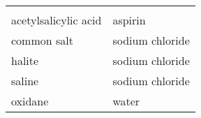 
%
%
{ %


\newcommand{\tableheader}{\rowcolor{myblue}\multicolumn{2}{l}{\colhead{aliases}} \\}
\newcommand{\columnheaders}{\rowcolor{myblue}\colhead{\pk{alias}} & \colhead{\fk{aliased}} \\}

\begin{tabular}[t] {|l|l|} %
\hline
\tableheader
\hline
\columnheaders
\hline 
acetylsalicylic acid & aspirin	\\
\hline
 common salt  & sodium chloride \\
\hline
halite  & sodium chloride \\
\hline
saline & sodium chloride  \\	
\hline
oxidane & water 	 \\
\hline
\end{tabular}
}
		 
	